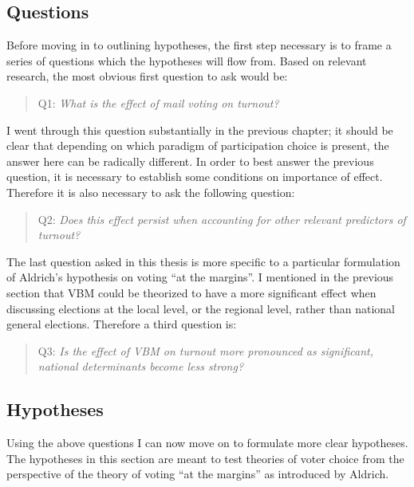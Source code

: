 \documentclass[12pt,twoside]{reedthesis}
\begin{document}
  \subsection{Questions}\label{questions}
  
  Before moving in to outlining hypotheses, the first step necessary is to
  frame a series of questions which the hypotheses will flow from. Based
  on relevant research, the most obvious first question to ask would be:
  
  \begin{quotation}
  Q1: \textit{What is the effect of mail voting on turnout?}
  \end{quotation}
  
  I went through this question substantially in the previous chapter; it
  should be clear that depending on which paradigm of participation choice
  is present, the answer here can be radically different. In order to best
  answer the previous question, it is necessary to establish some
  conditions on importance of effect. Therefore it is also necessary to
  ask the following question:
  
  \begin{quotation}   
  Q2: \textit{Does this effect persist when accounting for other relevant predictors of turnout?}
  \end{quotation}
  
  The last question asked in this thesis is more specific to a particular
  formulation of Aldrich's hypothesis on voting ``at the margins''. I
  mentioned in the previous section that VBM could be theorized to have a
  more significant effect when discussing elections at the local level, or
  the regional level, rather than national general elections. Therefore a
  third question is:
  
  \begin{quotation}   
  Q3: \textit{Is  the  effect  of  VBM on turnout more  pronounced as significant, national determinants become less strong?}
  \end{quotation}
  
  \subsection{Hypotheses}\label{hypotheses-1}
  
  Using the above questions I can now move on to formulate more clear
  hypotheses. The hypotheses in this section are meant to test theories of
  voter choice from the perspective of the theory of voting ``at the
  margins'' as introduced by Aldrich.
  
\end{document}
